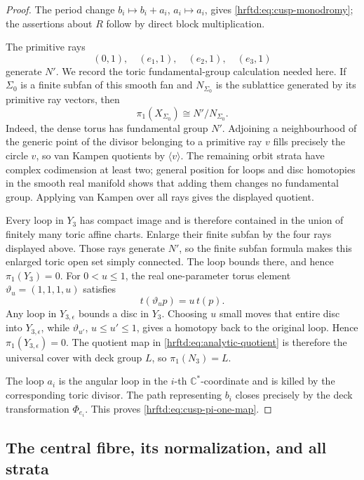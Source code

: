 \begin{proof}
The period change \(b_i\mapsto b_i+a_i\), \(a_i\mapsto a_i\), gives
\eqref{hrftd:eq:cusp-monodromy}; the assertions about \(R\) follow by direct
block multiplication.

The primitive rays
\[
 (0,1),\quad(e_1,1),\quad(e_2,1),\quad(e_3,1)
\]
generate \(N'\).  We record the toric fundamental-group calculation needed
here.  If \(\Sigma_0\) is a finite subfan of this smooth fan and
\(N_{\Sigma_0}\) is the sublattice generated by its primitive ray vectors,
then
\[
 \pi_1(X_{\Sigma_0})
 \cong N'/N_{\Sigma_0}.
\]
Indeed, the dense torus has fundamental group \(N'\).  Adjoining a
neighbourhood of the generic point of the divisor belonging to a primitive
ray \(v\) fills precisely the circle \(v\), so van Kampen quotients by
\(\langle v\rangle\).  The remaining orbit strata have complex codimension
at least two; general position for loops and disc homotopies in the smooth
real manifold shows that adding them changes no fundamental group.  Applying
van Kampen over all rays gives the displayed quotient.

Every loop in \(Y_3\) has compact image and is therefore contained in the
union of finitely many toric affine charts.  Enlarge their finite subfan by
the four rays displayed above.  Those rays generate \(N'\), so the finite
subfan formula makes this enlarged toric open set simply connected.  The
loop bounds there, and hence \(\pi_1(Y_3)=0\).
For \(0<u\le1\), the real one-parameter torus element
\(\vartheta_u=(1,1,1,u)\) satisfies
\[
 t(\vartheta_up)=u\,t(p).
\]
Any loop in \(Y_{3,\epsilon}\) bounds a disc in \(Y_3\).  Choosing \(u\)
small moves that entire disc into \(Y_{3,\epsilon}\), while
\(\vartheta_{u'}\), \(u\le u'\le1\), gives a homotopy back to the original
loop.  Hence \(\pi_1(Y_{3,\epsilon})=0\).  The quotient map in
\eqref{hrftd:eq:analytic-quotient} is therefore the universal cover with
deck group \(L\), so \(\pi_1(N_3)=L\).

The loop \(a_i\) is the angular loop in the \(i\)-th
\(\mathbb C^*\)-coordinate and is killed by the corresponding toric divisor.
The path representing \(b_i\) closes precisely by the deck transformation
\(\Phi_{e_i}\).  This proves \eqref{hrftd:eq:cusp-pi-one-map}.
\end{proof}

\subsection{The central fibre, its normalization, and all strata}
\label{hrftd:central-fibre}

